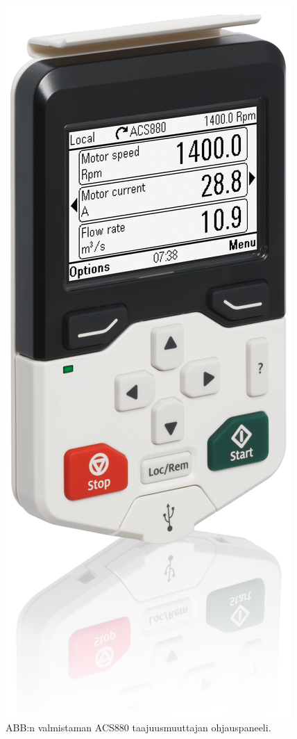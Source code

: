 \documentclass[finnish,12pt,a4paper,pdftex,elec,utf8]{aaltothesis}
\begin{document}
\begin{figure}[H]
	\begin{center}
	\includegraphics[scale=0.08]{acs880panel}
	\end{center}
	\caption{ABB:n valmistaman ACS880 taajuusmuuttajan ohjauspaneeli.
		 \cite{acs880panel}}
	\label{fig:acs880panel}
\end{figure}
\end{document}
